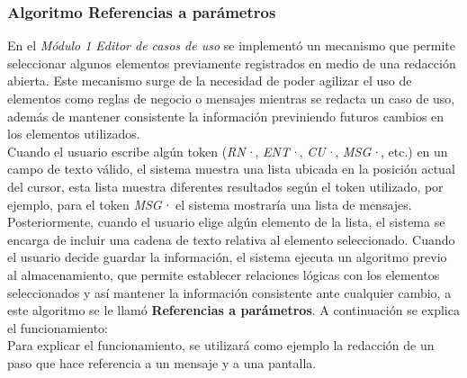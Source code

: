 	\subsubsection{Algoritmo Referencias a parámetros}
	
	En el {\it Módulo 1  Editor de casos de uso} se implementó un mecanismo que permite seleccionar algunos elementos previamente registrados en medio de una redacción abierta. Este mecanismo surge de la necesidad de poder agilizar el uso de elementos como reglas de negocio o mensajes mientras se redacta un caso de uso, además de mantener consistente la información previniendo futuros cambios en los elementos utilizados.\\
	

	Cuando el usuario escribe algún token ({\it RN·}, {\it ENT·}, {\it CU·}, {\it MSG·}, etc.) en un campo de texto válido, el sistema muestra una lista ubicada en la posición actual del cursor, esta lista muestra diferentes resultados según el token utilizado, por ejemplo, para el token {\it MSG·} el sistema mostraría una lista de mensajes. Posteriormente, cuando el usuario elige algún elemento de la lista, el sistema se encarga de incluir una cadena de texto relativa al elemento seleccionado. Cuando el usuario decide guardar la información, el sistema ejecuta un algoritmo previo al almacenamiento, que permite establecer relaciones lógicas con los elementos seleccionados y así mantener la información consistente ante cualquier cambio, a este algoritmo se le llamó {\bf Referencias a parámetros}. A continuación se explica el funcionamiento:\\
	
	Para explicar el funcionamiento, se utilizará como ejemplo la redacción de un paso que hace referencia a un mensaje y a una pantalla.
	
